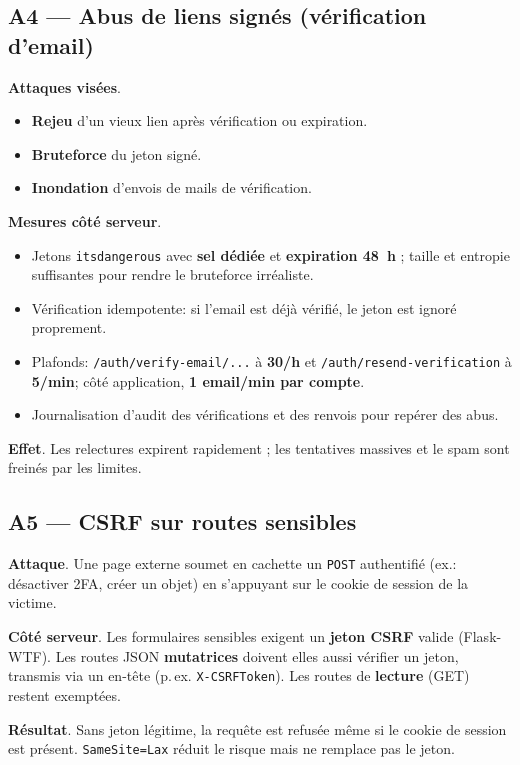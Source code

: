  

\subsection*{A4 — Abus de liens signés (vérification d'email)}
\textbf{Attaques visées}.
\begin{itemize}
  \item \textbf{Rejeu} d'un vieux lien après vérification ou expiration.
  \item \textbf{Bruteforce} du jeton signé.
  \item \textbf{Inondation} d'envois de mails de vérification.
\end{itemize}

\textbf{Mesures côté serveur}.
\begin{itemize}
  \item Jetons \texttt{itsdangerous} avec \textbf{sel dédiée} et \textbf{expiration 48~h} ; taille et entropie suffisantes pour rendre le bruteforce irréaliste.
  \item Vérification idempotente: si l'email est déjà vérifié, le jeton est ignoré proprement.
  \item Plafonds: \texttt{/auth/verify-email/...} à \textbf{30/h} et \texttt{/auth/resend-verification} à \textbf{5/min}; côté application, \textbf{1 email/min par compte}.
  \item Journalisation d'audit des vérifications et des renvois pour repérer des abus.
\end{itemize}

\textbf{Effet}. Les relectures expirent rapidement ; les tentatives massives et le spam sont freinés par les limites.

 

\subsection*{A5 — CSRF sur routes sensibles}
\textbf{Attaque}. Une page externe soumet en cachette un \texttt{POST} authentifié (ex.: désactiver 2FA, créer un objet) en s'appuyant sur le cookie de session de la victime.

\textbf{Côté serveur}. Les formulaires sensibles exigent un \textbf{jeton CSRF} valide (Flask-WTF). Les routes JSON \textbf{mutatrices} doivent elles aussi vérifier un jeton, transmis via un en-tête (p.\,ex. \texttt{X-CSRFToken}). Les routes de \textbf{lecture} (GET) restent exemptées.

\textbf{Résultat}. Sans jeton légitime, la requête est refusée même si le cookie de session est présent. \texttt{SameSite=Lax} réduit le risque mais ne remplace pas le jeton.

